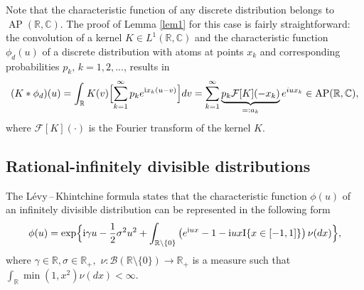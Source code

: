 \documentclass[numbers,webpdf,imaiai]{ima-authoring-template}%
\theoremstyle{thmstyletwo}%
\newcommand{\R}{\mathbb{R}}
\newcommand{\C}{\mathbb{C}}
\newcommand{\F}{\mathcal{F}}
\newcommand{\B}{\mathcal{B}}
\newcommand{\I}{{\mathrm{I}}}
\renewcommand{\i}{\mathrm{i}}
\newcommand{\AP}{\operatorname{AP}}
\numberwithin{equation}{section}
\begin{document}
Note that the characteristic function of any discrete distribution belongs to $\AP(\R, \C)$. The proof of Lemma \ref{lem1} for this case is fairly straightforward: the   convolution of a kernel $K \in L^1(\R, \C)$ and  the characteristic function $\phi_d(u)$ of a discrete distribution  with atoms at points $x_k$ and  corresponding probabilities $p_k, \, k = 1,2,...$, results in
\begin{align} \label{line1} 
     (K * \phi_d)(u) =  \int_{\R} K(v)\Bigl[\sum_{k=1}^{\infty} p_k e^{\i x_k (u-v)} \Bigr] dv = \sum_{k = 1}^{\infty}\underbrace{p_k \F[K](-x_k)}_{=:a_k}e^{iux_k} \in \AP(\R, \C),
\end{align} 
where $\F[K](\cdot)$ is the Fourier transform of the kernel \(K\). 

\subsection{Rational-infinitely divisible distributions} 
The L{\'e}vy\,--\,Khintchine formula states that the characteristic function $\phi(u)$ of an infinitely divisible distribution can be represented in the following form 
\begin{align} \label{LC}
    \phi(u)
    =
    \exp\Bigl\{
      \i \gamma u-\frac{1}{2}\sigma^2 u^2
			    +
		    \int_{\mathbb{R}\setminus \{0\}}
		    \left( 
		    		e^{\i u x}-1 - \i u x \I\{x \in [-1,1]\}		\right)			\nu(dx)\Bigr\},
\end{align}
where \(\gamma \in \R, \sigma \in \R_+,\) \(\nu: \B(\R \setminus \{0\}) \to \R_+\) is a measure such that  \(\int_{\R}  \min(1, x^2)\nu(dx) < \infty.\) 
\end{document}
